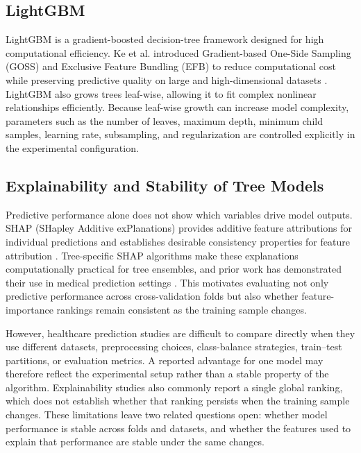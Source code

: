 \subsection{LightGBM}
\label{subsec:rw_lightgbm}

LightGBM is a gradient-boosted decision-tree framework designed for high
computational efficiency. Ke et al. introduced Gradient-based One-Side Sampling
(GOSS) and Exclusive Feature Bundling (EFB) to reduce computational cost while
preserving predictive quality on large and high-dimensional datasets
\cite{ke2017lightgbm}. LightGBM also grows trees leaf-wise, allowing it to fit
complex nonlinear relationships efficiently. Because leaf-wise growth can
increase model complexity, parameters such as the number of leaves, maximum
depth, minimum child samples, learning rate, subsampling, and regularization are
controlled explicitly in the experimental configuration.

\subsection{Explainability and Stability of Tree Models}
\label{subsec:rw_shap_stability}

Predictive performance alone does not show which variables drive model outputs.
SHAP (SHapley Additive exPlanations) provides additive feature attributions for
individual predictions and establishes desirable consistency properties for
feature attribution \cite{lundberg2017shap}. Tree-specific SHAP algorithms make
these explanations computationally practical for tree ensembles, and prior work
has demonstrated their use in medical prediction settings
\cite{lundberg2020treeexplainer}. This motivates evaluating not only predictive
performance across cross-validation folds but also whether feature-importance
rankings remain consistent as the training sample changes.

However, healthcare prediction studies are difficult to compare directly when
they use different datasets, preprocessing choices, class-balance strategies,
train--test partitions, or evaluation metrics. A reported advantage for one
model may therefore reflect the experimental setup rather than a stable property
of the algorithm. Explainability studies also commonly report a single global
ranking, which does not establish whether that ranking persists when the training
sample changes. These limitations leave two related questions open: whether
model performance is stable across folds and datasets, and whether the features
used to explain that performance are stable under the same changes.

